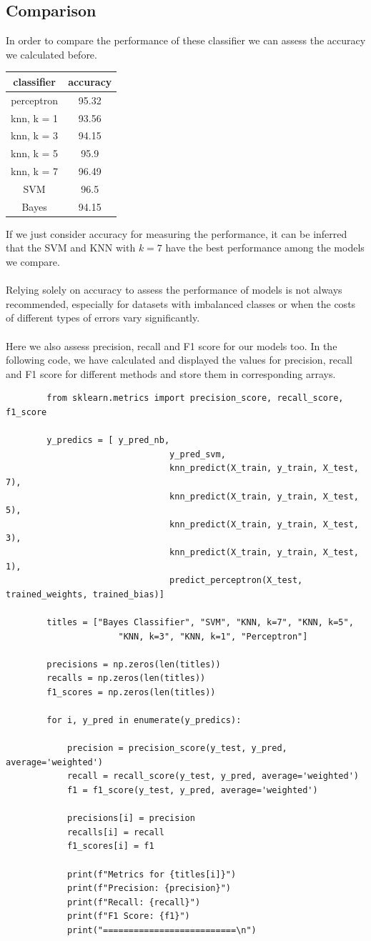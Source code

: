 \documentclass[]{article}
\begin{document}
	\subsection{Comparison}
	In order to compare the performance of these classifier we can assess the accuracy we calculated before. 
	\begin{center}
		\begin{tabular}{|c|c|}
			\hline
			classifier & accuracy \\
			\hline
			perceptron & 95.32 \\ \hline
			knn, k = 1 & 93.56 \\ \hline
			knn, k = 3 & 94.15 \\ \hline
			knn, k = 5 & 95.9 \\ \hline
			knn, k = 7 & 96.49 \\ \hline
			SVM & 96.5 \\ \hline
			Bayes & 94.15 \\ 
			\hline
		\end{tabular}
	\end{center}
	If we just consider accuracy for measuring the performance, it can be inferred that the SVM and KNN with $k=7$ have the best performance among the models we compare.\\\\
	Relying solely on accuracy to assess the performance of models is not always recommended, especially for datasets with imbalanced classes or when the costs of different types of errors vary significantly.\\\\
	Here we also assess precision, recall and F1 score for our models too. In the following code, we have calculated and displayed the values for precision, recall and F1 score for different methods and store them in corresponding arrays.
	\begin{lstlisting}
		from sklearn.metrics import precision_score, recall_score, f1_score
		
		y_predics = [ y_pred_nb, 
								y_pred_svm,
								knn_predict(X_train, y_train, X_test, 7),
								knn_predict(X_train, y_train, X_test, 5),
								knn_predict(X_train, y_train, X_test, 3),
								knn_predict(X_train, y_train, X_test, 1),
								predict_perceptron(X_test, trained_weights, trained_bias)]
		
		titles = ["Bayes Classifier", "SVM", "KNN, k=7", "KNN, k=5",
					  "KNN, k=3", "KNN, k=1", "Perceptron"]
		
		precisions = np.zeros(len(titles))
		recalls = np.zeros(len(titles))
		f1_scores = np.zeros(len(titles))
		
		for i, y_pred in enumerate(y_predics):
		
			precision = precision_score(y_test, y_pred, average='weighted')
			recall = recall_score(y_test, y_pred, average='weighted')
			f1 = f1_score(y_test, y_pred, average='weighted')
			
			precisions[i] = precision
			recalls[i] = recall
			f1_scores[i] = f1
			
			print(f"Metrics for {titles[i]}")
			print(f"Precision: {precision}")
			print(f"Recall: {recall}")
			print(f"F1 Score: {f1}")
			print("==========================\n")
	\end{lstlisting}
\end{document}
